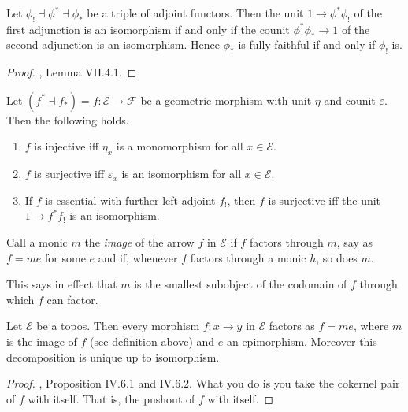 \begin{lemma}
Let $\phi_! \dashv \phi^* \dashv \phi_*$ be a triple of adjoint functors. Then the unit $1 \to \phi^* \phi_!$ of the first adjunction is an isomorphism if and only if the counit $\phi^* \phi_* \to 1$ of the second adjunction is an isomorphism. Hence $\phi_*$ is fully faithful if and only if $\phi_!$ is.
\end{lemma}
\begin{proof}
\cite{MacLaneMoerdijk91}, Lemma VII.4.1.
\end{proof}

\begin{corollary}
Let $(f^* \dashv f_*) = f : \mathscr{E} \to \mathscr{F}$ be a geometric morphism with unit $\eta$ and counit $\varepsilon$. Then the following holds.
\begin{enumerate}
  \item $f$ is injective iff $\eta_x$ is a monomorphism for all $x \in \mathscr{E}$.
  \item $f$ is surjective iff $\varepsilon_x$ is an isomorphism for all $x \in \mathscr{E}$.
  \item If $f$ is essential with further left adjoint $f_!$, then $f$ is surjective iff the unit $1 \to f^* f_!$ is an isomorphism.
\end{enumerate}
\end{corollary}

\begin{definition}
Call a monic $m$ the \emph{image} of the arrow $f$ in $\mathscr{E}$ if $f$ factors through $m$, say as $f = me$ for some $e$ and if, whenever $f$ factors through a monic $h$, so does $m$.
\end{definition}
This says in effect that $m$ is the smallest subobject of the codomain of $f$ through which $f$ can factor.

\begin{theorem}
\label{internal factorization}
Let $\mathscr{E}$ be a topos. Then every morphism $f : x \to y$ in $\mathscr{E}$ factors as $f = me$, where $m$ is the image of $f$ (see definition above) and $e$ an epimorphism. Moreover this decomposition is unique up to isomorphism.
\end{theorem}

\begin{proof}
\cite{MacLaneMoerdijk91}, Proposition IV.6.1 and IV.6.2. What you do is you take the cokernel pair of $f$ with itself. That is, the pushout of $f$ with itself.
\end{proof}

